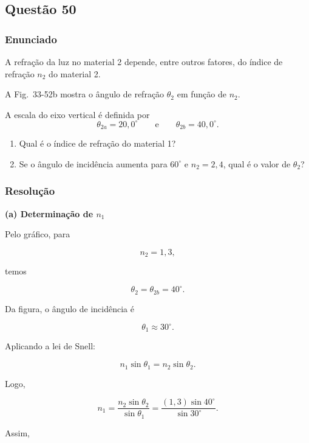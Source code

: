 \subsection{Questão 50}

\subsubsection{Enunciado}

A refração da luz no material 2 depende, entre outros fatores, do índice de refração \(n_2\) do material 2.

A Fig.~33-52b mostra o ângulo de refração \(\theta_2\) em função de \(n_2\).

A escala do eixo vertical é definida por
\[
\theta_{2a} = 20{,}0^\circ
\qquad \text{e} \qquad
\theta_{2b} = 40{,}0^\circ.
\]

\begin{enumerate}
    \item[(a)] Qual é o índice de refração do material 1?

    \item[(b)] Se o ângulo de incidência aumenta para \(60^\circ\) e \(n_2 = 2{,}4\), qual é o valor de \(\theta_2\)?
\end{enumerate}

\begin{figure}[h]
    \centering
    \label{fig:33-52}
\end{figure}


\subsubsection{Resolução}

\textbf{(a) Determinação de \(n_1\)}

Pelo gráfico, para

\[
n_2=1{,}3,
\]

temos

\[
\theta_2=\theta_{2b}=40^\circ.
\]

Da figura, o ângulo de incidência é

\[
\theta_1 \approx 30^\circ.
\]

Aplicando a lei de Snell:

\[
n_1\sin\theta_1=n_2\sin\theta_2.
\]

Logo,

\[
n_1=\frac{n_2\sin\theta_2}{\sin\theta_1}
=\frac{(1{,}3)\sin40^\circ}{\sin30^\circ}.
\]

Assim,

